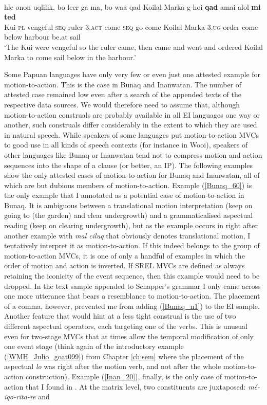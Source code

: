 \ea \label{KYO003}
\\
\gll hle onon uqlilik, bo leer ga ma, bo waa qad Koilal Marka g-hoi \textbf{qad} amai alol \textbf{mi} \textbf{ted} \\
Kui \textsc{pl} vengeful \textsc{seq} ruler \textsc{3}.\textsc{act} come \textsc{seq} go come Koilal Marka \textsc{3}.\textsc{ug}-order come below harbour be.at sail \\
\glft `The Kui were vengeful so the ruler came, then came and went and ordered Koilal Marka to come sail below in the harbour.'\\ 
\z

Some Papuan languages have only very few or even just one attested example for motion-to-action. This is the case in Bunaq and Inanwatan. The number of attested case remained low even after a search of the appended texts of the respective data sources. We would therefore need to assume that, although motion-to-action construals are probably available in all EI languages one way or another, such construals differ considerably in the extent to which they are used in natural speech. While speakers of some languages put motion-to-action MVCs to good use in all kinds of speech contexts (for instance in Wooi), speakers of other languages like Bunaq or Inanwatan tend not to compress motion and action sequences into the shape of a clause (or better, an IP). The following examples show the only attested cases of motion-to-action for Bunaq and Inanwatan, all of which are but dubious members of motion-to-action. Example (\ref{Bunaq_60}) is the only example that I annotated as a potential case of motion-to-action in Bunaq. It is ambiguous between a translational motion interpretation (keep on going to (the garden) and clear undergrowth) and a grammaticalised aspectual reading (keep on clearing undergrowth), but as the example occurs in \citet[463]{schapper2009bunaq} right after another example with \textit{mal ciluq} that obviously denotes translational motion, I tentatively interpret it as motion-to-action. If this indeed belongs to the group of motion-to-action MVCs, it is one of only a handful of examples in which the order of motion and action is inverted. If SREL MVCs are defined as always retaining the iconicity of the event sequence, then this example would need to be dropped. In the text sample appended to Schapper's grammar I only came across one more utterance that bears a resemblance to motion-to-action. The placement of a comma, however, prevented me from adding (\ref{Bunaq_n1}) to the EI sample. Another feature that would hint at a less tight construal is the use of two different aspectual operators, each targeting one of the verbs. This is unusual even for two-stage MVCs that at times allow the temporal modification of only one event stage (think again of the introductory example (\ref{WMH_Julio_goat099}) from Chapter \ref{ch:sem} where the placement of the aspectual \textit{lo} was right after the motion verb, and not after the whole motion-to-action construction). Example (\ref{Inan_20}), finally, is the only case of motion-to-action that I found in \citet{devries2004}. At the matrix level, two constituents are juxtaposed: \textit{mé-iqo-rita-re} and 
